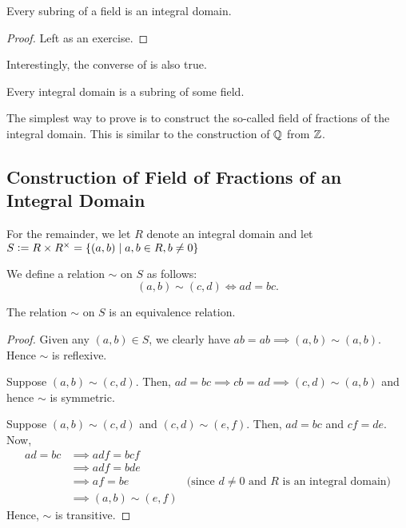 \begin{prop} \label{prop:subring-of-field-is-ID}
    Every subring of a field is an integral domain.
\end{prop}
\begin{proof}
    Left as an exercise.
\end{proof}

Interestingly, the converse of  is also true.

\begin{prop} \label{prop:ID-has-fof}
    Every integral domain is a subring of some field.
\end{prop}

The simplest way to prove  is to construct the so-called field of fractions of the integral domain. This is similar to the construction of $\mathbb{Q}$ from $\mathbb{Z}$.

\subsection{Construction of Field of Fractions of an Integral Domain}

For the remainder, we let $R$ denote an integral domain and let $S \vcentcolon= R \times R^{\times} = \{ (a,b) \mid a,b \in R, b \neq 0 \}$

\begin{defn}
    We define a relation $\sim$ on $S$ as follows:
    \[
        (a,b) \sim (c,d) \iff ad = bc.
    \]
\end{defn}
\begin{lem}
    The relation $\sim$ on $S$ is an equivalence relation. 
\end{lem}
\begin{proof}
    Given any $(a,b) \in S$, we clearly have $ab = ab \implies (a,b) \sim (a,b)$. Hence $\sim$ is reflexive. 
    
    Suppose $(a,b) \sim (c,d)$. Then, $ad = bc \implies cb = ad  \implies (c,d) \sim (a,b)$ and hence $\sim$ is symmetric.
    
    Suppose $(a,b) \sim (c,d)$ and $(c,d) \sim (e,f)$. Then, $ad = bc$ and $cf = de$. Now,
    \begin{align*}
        ad = bc &\implies adf = bcf  \\
        &\implies adf = bde \\
        &\implies af = be &\text{(since $d \neq 0$ and $R$ is an integral domain)}\\ 
        &\implies (a,b) \sim (e,f)
    \end{align*}
    Hence, $\sim$ is transitive.
\end{proof}

